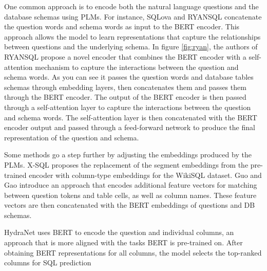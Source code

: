 One common approach is to encode both the natural language questions and the database schemas using PLMs. For instance, SQLova\cite{DBLP:journals/corr/abs-1902-01069} and RYANSQL\cite{10.1162/coli_a_00403} concatenate the question words and schema words as input to the BERT encoder. This approach allows the model to learn representations that capture the relationships between questions and the underlying schema. In figure \ref{fig:ryan}, the authors of RYANSQL\cite{10.1162/coli_a_00403} propose a novel encoder that combines the BERT encoder with a self-attention mechanism to capture the interactions between the question and schema words. As you can see it passes the question words and database tables schemas through embedding layers, then concatenates them and passes them through the BERT encoder. The output of the BERT encoder is then passed through a self-attention layer to capture the interactions between the question and schema words. The self-attention layer is then concatenated with the BERT encoder output and passed through a feed-forward network to produce the final representation of the question and schema.

Some methods go a step further by adjusting the embeddings produced by the PLMs. X-SQL\cite{he2019xsql} proposes the replacement of the segment embeddings from the pre-trained encoder with column-type embeddings for the WikiSQL dataset. Guo and Gao \cite{guo2020content} introduce an approach that encodes additional feature vectors for matching between question tokens and table cells, as well as column names. These feature vectors are then concatenated with the BERT embeddings of questions and DB schemas.

HydraNet\cite{lyu_hybrid_2020} uses BERT to encode the question and individual columns, an approach that is more aligned with the tasks BERT is pre-trained on. After obtaining BERT representations for all columns, the model selects the top-ranked columns for SQL prediction


\begin{table}[t]
    \centering
    \caption{The execution accuracy on the WikiSQL dev set.}
    \label{table:methods:encoders:adaptplm}
\end{table}

